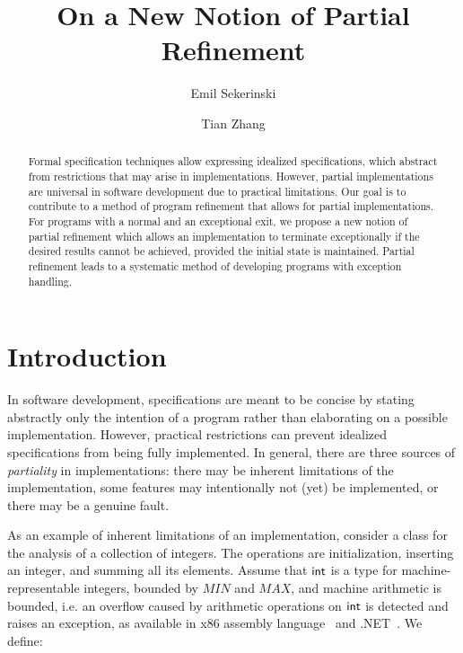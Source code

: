 \documentclass[submission,copyright,creativecommons]{eptcs}
\title{On a New Notion of Partial Refinement}
\author{Emil Sekerinski
  \institute{McMaster University\\ Hamilton, Canada}
  \email{emil@mcmaster.ca}
\and Tian Zhang
  \institute{McMaster University\\ Hamilton, Canada}
  \email{zhangt26@mcmaster.ca}
}
\newcommand{\KW}[1]{\mathop{\sf #1}}
\newcommand{\Int}{\KW{int}}
\begin{document}
\maketitle

\newenvironment{eqnarr}
{\[\begin{array}{@{}lllllllllll@{}}}
    {\end{array}\]}
\newtheorem{definition}{Definition}
\newtheorem{theorem}{Theorem}
\newenvironment{proof}{\par\noindent\em Proof.}{\par}

\begin{abstract}

Formal specification techniques allow expressing idealized specifications, which abstract from restrictions that may arise in implementations. However, partial implementations are universal in software development due to practical limitations. Our goal is to contribute to a method of program refinement that allows for partial implementations. For programs with a normal and an exceptional exit, we propose a new notion of partial refinement which allows an implementation to terminate exceptionally if the desired results cannot be achieved, provided the initial state is maintained. Partial refinement leads to a systematic method of developing programs with exception handling.

\end{abstract}

\section{Introduction}

In software development, specifications are meant to be concise by stating abstractly only the intention of a program rather than elaborating on a possible implementation. However, practical restrictions can prevent idealized specifications from being fully implemented. In general, there are three sources of {\em partiality} in implementations: there may be inherent limitations of the implementation, some features may intentionally not (yet) be implemented, or there may be a genuine fault.

As an example of inherent limitations of an implementation, consider a class for the analysis of a collection of integers. The operations are initialization, inserting an integer, and summing all its elements. Assume that $\Int$ is a type for machine-representable integers, bounded by $MIN$ and $MAX$, and machine arithmetic is bounded, i.e. an overflow caused by arithmetic operations on $\Int$ is detected and raises an exception, as available in x86 assembly language~\cite{Intel13Assembly} and .NET~\cite{MS13OverflowException}.
We define:
\end{document}
